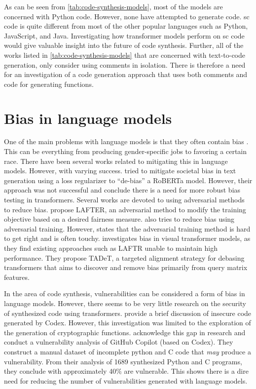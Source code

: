 As can be seen from \cref{tab:code-synthesis-models}, most of the models are concerned with Python code. However, none have attempted to generate  code. \acrshort{sc} code is quite different from most of the other popular languages such as Python, JavaScript, and Java. Investigating how transformer models perform on \acrshort{sc} code would give valuable insight into the future of code synthesis. Further, all of the works listed in \cref{tab:code-synthesis-models} that are concerned with text-to-code generation, only consider using comments in isolation. There is therefore a need for an investigation of a code generation approach that uses both comments and code for generating functions.

\section{Bias in language models}
\label{sec:bias-in-language-models}
One of the main problems with language models is that they often contain bias \cite{li2021detecting}. This can be everything from producing gender-specific jobs to favoring a certain race. There have been several works related to mitigating this in language models. However, with varying success. \textcite{Silva2021TowardsAC} tried to mitigate societal bias in text generation using a loss regularizer to “de-bias” a RoBERTa model. However, their approach was not successful and conclude there is a need for more robust bias testing in transformers. Several works are devoted to using adversarial methods to reduce bias. \textcite{laftr2018} propose LAFTER, an adversarial method to modify the training objective based on a desired fairness measure. \textcite{zhang2018mitigating} also tries to reduce bias using adversarial training. However, \cite{zhang2018mitigating} states that the adversarial training method is hard to get right and is often touchy. \textcite{mitigating2021} investigates bias in visual transformer models, as they find existing approaches such as LAFTR unable to maintain high performance. They propose TADeT, a targeted alignment strategy for debasing transformers that aims to discover and remove bias primarily from query matrix features. 

In the area of code synthesis, vulnerabilities can be considered a form of bias in language models. However, there seems to be very little research on the security of synthesized code using transformers. \cite{chen2021codex} provide a brief discussion of insecure code generated by Codex. However, this investigation was limited to the exploration of the generation of cryptographic functions. \textcite{pearch2021asleep} acknowledge this gap in research and conduct a vulnerability analysis of GitHub Copilot (based on Codex). They construct a manual dataset of incomplete python and C code that \textit{may} produce a vulnerability. From their analysis of 1689 synthesized Python and C programs, they conclude with approximately 40\% are vulnerable. This shows there is a dire need for reducing the number of vulnerabilities generated with language models.


